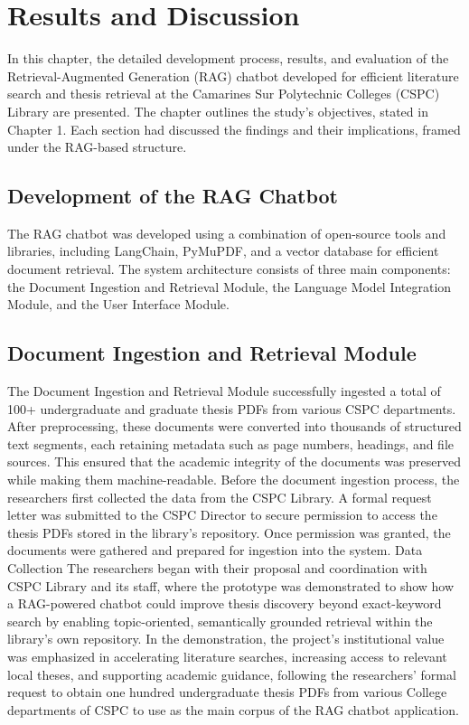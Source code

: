 
\chapter{Results and Discussion}
\begin{refsection}

In this chapter, the detailed development process, results, and evaluation of the Retrieval-Augmented Generation (RAG) chatbot developed for efficient literature search and thesis retrieval at the Camarines Sur Polytechnic Colleges (CSPC) Library are presented. The chapter outlines the study’s objectives, stated in Chapter 1. Each section had discussed the findings and their implications, framed under the RAG-based structure.

\section{Development of the RAG Chatbot}
The RAG chatbot was developed using a combination of open-source tools and libraries, including LangChain, PyMuPDF, and a vector database for efficient document retrieval. The system architecture consists of three main components: the Document Ingestion and Retrieval Module, the Language Model Integration Module, and the User Interface Module.

\section{Document Ingestion and Retrieval Module}
The Document Ingestion and Retrieval Module successfully ingested a total of 100+ undergraduate and graduate thesis PDFs from various CSPC departments. After preprocessing, these documents were converted into thousands of structured text segments, each retaining metadata such as page numbers, headings, and file sources. This ensured that the academic integrity of the documents was preserved while making them machine-readable. Before the document ingestion process, the researchers first collected the data from the CSPC Library. A formal request letter was submitted to the CSPC Director to secure permission to access the thesis PDFs stored in the library’s repository. Once permission was granted, the documents were gathered and prepared for ingestion into the system.
Data Collection 
The researchers began with their proposal and coordination with CSPC Library and its staff, where the prototype was demonstrated to show how a RAG-powered chatbot could improve thesis discovery beyond exact-keyword search by enabling topic-oriented, semantically grounded retrieval within the library’s own repository. 
In the demonstration, the project’s institutional value was emphasized in accelerating literature searches, increasing access to relevant local theses, and supporting academic guidance, following the researchers' formal request to obtain one hundred undergraduate thesis PDFs from various College departments of CSPC to use as the main corpus of the RAG chatbot application.


\end{refsection}
